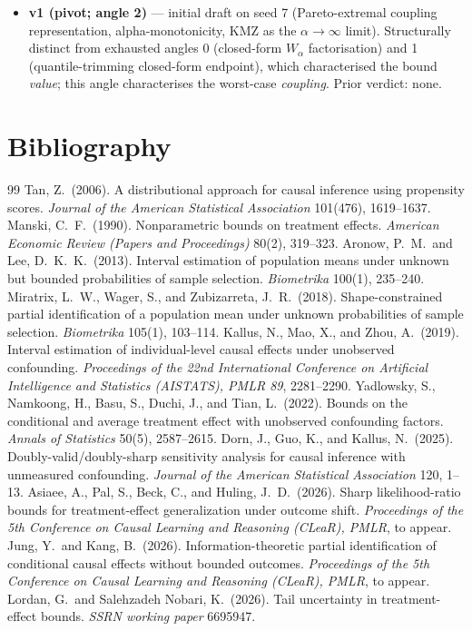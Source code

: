 \documentclass[11pt]{article}
\theoremstyle{definition}
\theoremstyle{plain}
\theoremstyle{remark}
\begin{document}
\begin{itemize}[leftmargin=1.4em,itemsep=0pt]
  \item \textbf{v1 (pivot; angle 2)} --- initial draft on seed 7 (Pareto-extremal coupling representation, alpha-monotonicity, KMZ as the $\alpha\to\infty$ limit). Structurally distinct from exhausted angles 0 (closed-form $W_\alpha$ factorisation) and 1 (quantile-trimming closed-form endpoint), which characterised the bound \emph{value}; this angle characterises the worst-case \emph{coupling}. Prior verdict: none.
\end{itemize}

\section*{Bibliography}
\begin{thebibliography}{99}
 Tan, Z.\ (2006). A distributional approach for causal inference using propensity scores. \emph{Journal of the American Statistical Association} 101(476), 1619--1637.
 Manski, C.\ F.\ (1990). Nonparametric bounds on treatment effects. \emph{American Economic Review (Papers and Proceedings)} 80(2), 319--323.
 Aronow, P.\ M.\ and Lee, D.\ K.\ K.\ (2013). Interval estimation of population means under unknown but bounded probabilities of sample selection. \emph{Biometrika} 100(1), 235--240.
 Miratrix, L.\ W., Wager, S., and Zubizarreta, J.\ R.\ (2018). Shape-constrained partial identification of a population mean under unknown probabilities of sample selection. \emph{Biometrika} 105(1), 103--114.
 Kallus, N., Mao, X., and Zhou, A.\ (2019). Interval estimation of individual-level causal effects under unobserved confounding. \emph{Proceedings of the 22nd International Conference on Artificial Intelligence and Statistics (AISTATS), PMLR 89}, 2281--2290.
 Yadlowsky, S., Namkoong, H., Basu, S., Duchi, J., and Tian, L.\ (2022). Bounds on the conditional and average treatment effect with unobserved confounding factors. \emph{Annals of Statistics} 50(5), 2587--2615.
 Dorn, J., Guo, K., and Kallus, N.\ (2025). Doubly-valid/doubly-sharp sensitivity analysis for causal inference with unmeasured confounding. \emph{Journal of the American Statistical Association} 120, 1--13.
 Asiaee, A., Pal, S., Beck, C., and Huling, J.\ D.\ (2026). Sharp likelihood-ratio bounds for treatment-effect generalization under outcome shift. \emph{Proceedings of the 5th Conference on Causal Learning and Reasoning (CLeaR), PMLR}, to appear.
 Jung, Y.\ and Kang, B.\ (2026). Information-theoretic partial identification of conditional causal effects without bounded outcomes. \emph{Proceedings of the 5th Conference on Causal Learning and Reasoning (CLeaR), PMLR}, to appear.
 Lordan, G.\ and Salehzadeh Nobari, K.\ (2026). Tail uncertainty in treatment-effect bounds. \emph{SSRN working paper} 6695947.
\end{thebibliography}
\end{document}
